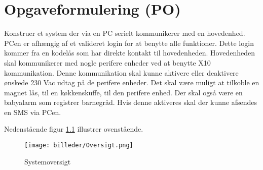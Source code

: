 \chapter{Opgaveformulering (PO)}


Konstruer et system der via en PC serielt kommunikerer med en hovedenhed. PCen er afhængig af et valideret login for at benytte alle funktioner. Dette login kommer fra en kodelås som har direkte kontakt til hovedenheden. Hovedenheden skal kommunikerer med nogle perifere enheder ved at benytte X10 kommunikation. Denne kommunikation skal kunne aktivere eller deaktivere ønskede 230 Vac udtag på de perifere enheder. Det skal være muligt at tilkoble en magnet lås, til en køkkenskuffe, til den perifere enhed. Der skal også være en babyalarm som registrer barnegråd. Hvis denne aktiveres skal der kunne afsendes en SMS via PCen.

Nedenstående figur \ref{fig:Systemoversigt} illustrer ovenstående.

\begin{figure}[htbp]
  \centering
    \texttt{[image: billeder/Oversigt.png]}
    \caption{Systemoversigt}
    \label{fig:Systemoversigt}
\end{figure}